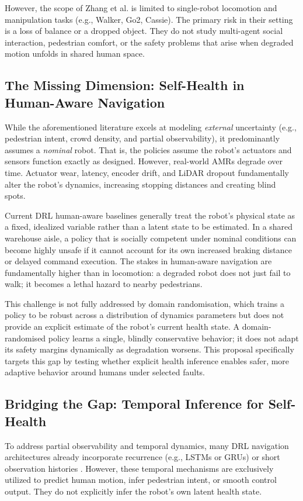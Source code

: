 \documentclass[11pt,a4paper]{article}
\begin{document}
However, the scope of Zhang et al. is limited to single-robot locomotion and manipulation tasks (e.g., Walker, Go2, Cassie). The primary risk in their setting is a loss of balance or a dropped object. They do not study multi-agent social interaction, pedestrian comfort, or the safety problems that arise when degraded motion unfolds in shared human space.

\subsection{The Missing Dimension: Self-Health in Human-Aware Navigation}
While the aforementioned literature excels at modeling \textit{external} uncertainty (e.g., pedestrian intent, crowd density, and partial observability), it predominantly assumes a \textit{nominal} robot. That is, the policies assume the robot's actuators and sensors function exactly as designed. However, real-world AMRs degrade over time. Actuator wear, latency, encoder drift, and LiDAR dropout fundamentally alter the robot's dynamics, increasing stopping distances and creating blind spots. 

Current DRL human-aware baselines \cite{chen2018crowd, liu2020decentralized, xie2023drlvo} generally treat the robot's physical state as a fixed, idealized variable rather than a latent state to be estimated. In a shared warehouse aisle, a policy that is socially competent under nominal conditions can become highly unsafe if it cannot account for its own increased braking distance or delayed command execution. The stakes in human-aware navigation are fundamentally higher than in locomotion: a degraded robot does not just fail to walk; it becomes a lethal hazard to nearby pedestrians.

This challenge is not fully addressed by domain randomisation, which trains a policy to be robust across a distribution of dynamics parameters but does not provide an explicit estimate of the robot's current health state. A domain-randomised policy learns a single, blindly conservative behavior; it does not adapt its safety margins dynamically as degradation worsens. This proposal specifically targets this gap by testing whether explicit health inference enables safer, more adaptive behavior around humans under selected faults.

\subsection{Bridging the Gap: Temporal Inference for Self-Health}
To address partial observability and temporal dynamics, many DRL navigation architectures already incorporate recurrence (e.g., LSTMs or GRUs) or short observation histories \cite{liu2020decentralized, xie2023drlvo}. However, these temporal mechanisms are exclusively utilized to predict human motion, infer pedestrian intent, or smooth control output. They do not explicitly infer the robot's own latent health state. 
\end{document}
